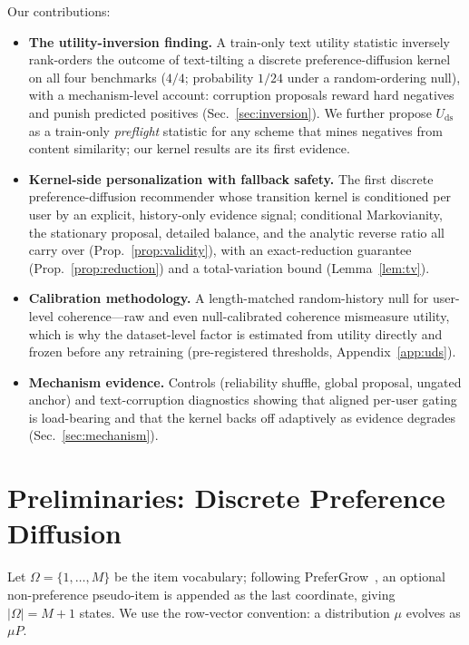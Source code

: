 \documentclass[letterpaper]{article}
\newcommand{\Uds}{U_{\mathrm{ds}}}
\begin{document}
Our contributions:
\begin{itemize}
  \item \textbf{The utility-inversion finding.} A train-only text
  utility statistic inversely rank-orders the outcome of text-tilting a
  discrete preference-diffusion kernel on all four benchmarks
  ($4/4$; probability $1/24$ under a random-ordering null), with a
  mechanism-level account: corruption proposals reward hard negatives
  and punish predicted positives (Sec.~\ref{sec:inversion}). We
  further propose $\Uds$ as a train-only \emph{preflight} statistic
  for any scheme that mines negatives from content similarity; our
  kernel results are its first evidence.
  \item \textbf{Kernel-side personalization with fallback safety.} The
  first discrete preference-diffusion recommender whose transition
  kernel is conditioned per user by an explicit, history-only evidence
  signal; conditional Markovianity, the stationary proposal, detailed
  balance, and the analytic reverse ratio all carry over
  (Prop.~\ref{prop:validity}), with an exact-reduction guarantee
  (Prop.~\ref{prop:reduction}) and a total-variation bound
  (Lemma~\ref{lem:tv}).
  \item \textbf{Calibration methodology.} A length-matched
  random-history null for user-level coherence---raw and even
  null-calibrated coherence mismeasure utility, which is why the
  dataset-level factor is estimated from utility directly and frozen
  before any retraining (pre-registered thresholds,
  Appendix~\ref{app:uds}).
  \item \textbf{Mechanism evidence.} Controls (reliability shuffle,
  global proposal, ungated anchor) and text-corruption diagnostics
  showing that aligned per-user gating is load-bearing and that the
  kernel backs off adaptively as evidence degrades
  (Sec.~\ref{sec:mechanism}).
\end{itemize}

\section{Preliminaries: Discrete Preference Diffusion}
\label{sec:prelim}

Let $\Omega=\{1,\dots,M\}$ be the item vocabulary; following
PreferGrow~\cite{prefergrow}, an optional non-preference pseudo-item is
appended as the last coordinate, giving $|\Omega|=M{+}1$ states. We use
the row-vector convention: a distribution $\mu$ evolves as $\mu P$.
\end{document}
